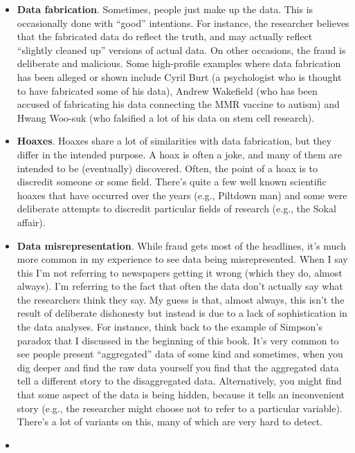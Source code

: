 \documentclass[
]{book}
\providecommand{\tightlist}{%
  \setlength{\itemsep}{0pt}\setlength{\parskip}{0pt}}
\begin{document}
\begin{itemize}
\tightlist
\item
  \textbf{Data fabrication}. Sometimes, people just make up the data. This is occasionally done with ``good'' intentions. For instance, the researcher believes that the fabricated data do reflect the truth, and may actually reflect ``slightly cleaned up'' versions of actual data. On other occasions, the fraud is deliberate and malicious. Some high-profile examples where data fabrication has been alleged or shown include Cyril Burt (a psychologist who is thought to have fabricated some of his data), Andrew Wakefield (who has been accused of fabricating his data connecting the MMR vaccine to autism) and Hwang Woo-suk (who falsified a lot of his data on stem cell research).
\item
  \textbf{Hoaxes}. Hoaxes share a lot of similarities with data fabrication, but they differ in the intended purpose. A hoax is often a joke, and many of them are intended to be (eventually) discovered. Often, the point of a hoax is to discredit someone or some field. There's quite a few well known scientific hoaxes that have occurred over the years (e.g., Piltdown man) and some were deliberate attempts to discredit particular fields of research (e.g., the Sokal affair).
\item
  \textbf{Data misrepresentation}. While fraud gets most of the headlines, it's much more common in my experience to see data being misrepresented. When I say this I'm not referring to newspapers getting it wrong (which they do, almost always). I'm referring to the fact that often the data don't actually say what the researchers think they say. My guess is that, almost always, this isn't the result of deliberate dishonesty but instead is due to a lack of sophistication in the data analyses. For instance, think back to the example of Simpson's paradox that I discussed in the beginning of this book. It's very common to see people present ``aggregated'' data of some kind and sometimes, when you dig deeper and find the raw data yourself you find that the aggregated data tell a different story to the disaggregated data. Alternatively, you might find that some aspect of the data is being hidden, because it tells an inconvenient story (e.g., the researcher might choose not to refer to a particular variable). There's a lot of variants on this, many of which are very hard to detect.
\item

\end{itemize}
\end{document}
